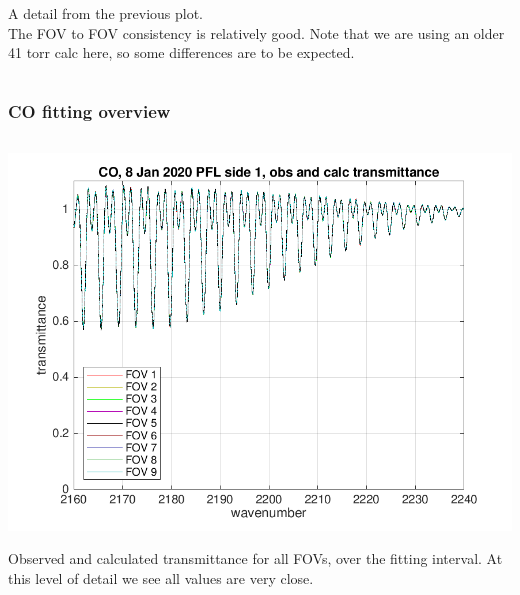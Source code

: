 \documentclass[10pt]{beamer}
\begin{document}
\begin{frame}
\begin{columns}[t]
\begin{column}{0.5\textwidth}
A detail from the previous plot. \\ The FOV to FOV consistency is
relatively good.  Note that we are using an older 41 torr calc here,
so some differences are to be expected.

\end{column}
\end{columns}
\end{frame}
\begin{frame}
\frametitle{CO fitting overview}
\begin{columns}[t]
\begin{column}{0.5\textwidth}  
  \begin{centering}
  \includegraphics[width=\textwidth]{figures/CO_obs_and_calc.png}
  \end{centering}\vspace{3mm}

Observed and calculated transmittance for all FOVs, over the fitting
interval.  At this level of detail we see all values are very close.

\end{column}


\end{columns}
\end{frame}
\end{document}
